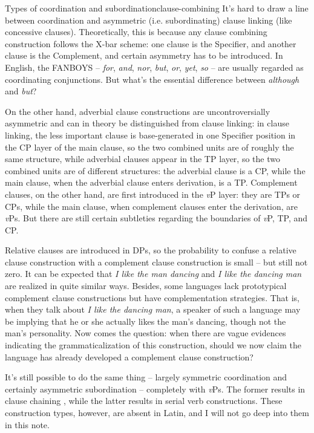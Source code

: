 \documentclass[a4paper, oneside]{report}
\newcommand{\corpus}[1]{\emph{#1}}
\newcommand{\vP}{\textit{v}P}
\begin{document}
\begin{theorybox}{Types of coordination and subordination}{clause-combining}
    It's hard to draw a line between coordination and asymmetric (i.e. subordinating) clause linking 
    (like concessive clauses).
    Theoretically, this is because any clause combining construction follows the X-bar scheme:
    one clause is the Specifier, 
    and another clause is the Complement,
    and certain asymmetry has to be introduced.
    In English, the FANBOYS 
    -- \corpus{for}, \corpus{and}, \corpus{nor}, \corpus{but}, 
    \corpus{or}, \corpus{yet}, \corpus{so} -- are usually regarded as coordinating conjunctions.
    But what's the essential difference between \corpus{although} and \corpus{but}?

    On the other hand, adverbial clause constructions 
    are uncontroversially asymmetric and can in theory be distinguished from clause linking:
    in clause linking, the less important clause 
    is base-generated in one Specifier position in the CP layer of the main clause,
    so the two combined units are of roughly the same structure,
    while adverbial clauses appear in the TP layer,
    so the two combined units are of different structures:
    the adverbial clause is a CP,
    while the main clause, when the adverbial clause enters derivation,
    is a TP.
    Complement clauses, on the other hand, are first introduced in the \vP{} layer:
    they are TPs or CPs,
    while the main clause, when complement clauses enter the derivation,
    are \vP s.
    But there are still certain subtleties regarding the boundaries of \vP{}, TP, and CP.

    Relative clauses are introduced in DPs, 
    so the probability to confuse a relative clause construction 
    with a complement clause construction is small -- but still not zero.
    It can be expected that \corpus{I like the man dancing} and \corpus{I like the dancing man} 
    are realized in quite similar ways.
    Besides, some languages lack prototypical complement clause constructions 
    but have complementation strategies.
    That is, when they talk about \corpus{I like the dancing man},
    a speaker of such a language may be implying that he or she actually likes the man's dancing,
    though not the man's personality.
    Now comes the question:
    when there are vague evidences indicating the grammaticalization of this construction,
    should we now claim the language has already developed a complement clause construction?

    It's still possible to do the same thing 
    -- largely symmetric coordination and certainly asymmetric subordination -- 
    completely with \vP s.
    The former results in clause chaining \citep{nonato2014clause},
    while the latter results in serial verb constructions.
    These construction types, however, are absent in Latin, and I will not go deep into them in this note.
\end{theorybox}
\end{document}
